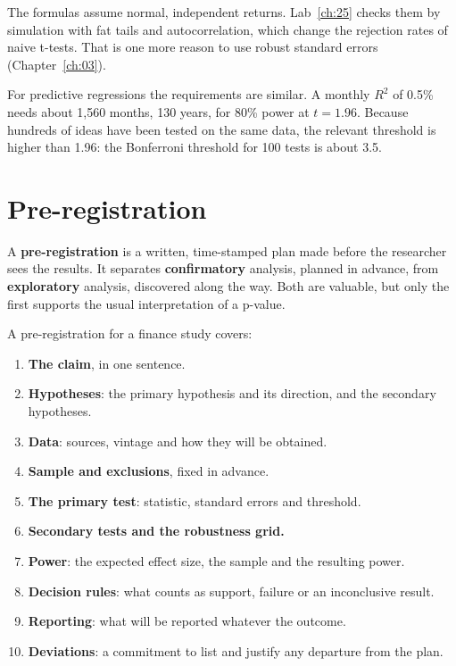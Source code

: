 The formulas assume normal, independent returns. Lab~\ref{ch:25} checks them by simulation with fat tails and autocorrelation, which change the rejection rates of naive t-tests. That is one more reason to use robust standard errors (Chapter~\ref{ch:03}).

For predictive regressions the requirements are similar. A monthly $R^2$ of 0.5\% needs about 1,560 months, 130 years, for 80\% power at $t = 1.96$. Because hundreds of ideas have been tested on the same data, the relevant threshold is higher than 1.96: the Bonferroni threshold for 100 tests is about 3.5.

\section{Pre-registration}
\label{sec:25-prereg}

A \textbf{pre-registration} is a written, time-stamped plan made before the researcher sees the results. It separates \textbf{confirmatory} analysis, planned in advance, from \textbf{exploratory} analysis, discovered along the way. Both are valuable, but only the first supports the usual interpretation of a p-value.

A pre-registration for a finance study covers:

\begin{enumerate}
  \item \textbf{The claim}, in one sentence.
  \item \textbf{Hypotheses}: the primary hypothesis and its direction, and the secondary hypotheses.
  \item \textbf{Data}: sources, vintage and how they will be obtained.
  \item \textbf{Sample and exclusions}, fixed in advance.
  \item \textbf{The primary test}: statistic, standard errors and threshold.
  \item \textbf{Secondary tests and the robustness grid.}
  \item \textbf{Power}: the expected effect size, the sample and the resulting power.
  \item \textbf{Decision rules}: what counts as support, failure or an inconclusive result.
  \item \textbf{Reporting}: what will be reported whatever the outcome.
  \item \textbf{Deviations}: a commitment to list and justify any departure from the plan.
\end{enumerate}

